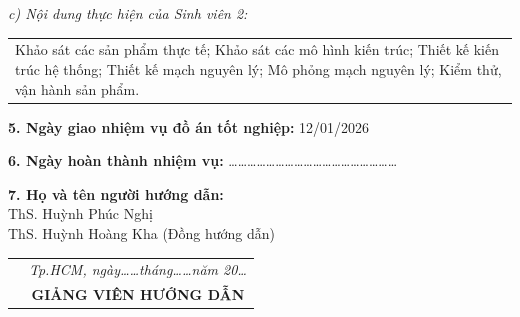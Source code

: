 \hphantom{..}\textit{c) Nội dung thực hiện của Sinh viên 2:} \\
\begin{tabular}{p{\textwidth}}
Khảo sát các sản phẩm thực tế; Khảo sát các mô hình kiến trúc; Thiết kế kiến trúc hệ thống; Thiết kế mạch nguyên lý; Mô phỏng mạch nguyên lý; Kiểm thử, vận hành sản phẩm.
\end{tabular}

\hphantom{..}\textbf{5. Ngày giao nhiệm vụ đồ án tốt nghiệp:} 12/01/2026

\hphantom{..}\textbf{6. Ngày hoàn thành nhiệm vụ:} \dots\dots\dots\dots\dots\dots\dots\dots\dots\dots\dots\dots\dots\dots\dots\dots\dots\dots

\hphantom{..}\textbf{7. Họ và tên người hướng dẫn:}\\
\hphantom{..}ThS. Huỳnh Phúc Nghị\\
\hphantom{..}ThS. Huỳnh Hoàng Kha (Đồng hướng dẫn)

\vspace{5pt}
\begin{tabular}{p{} p{}}
    & \multicolumn{1}{c}{\textit{Tp.HCM, ngày\dots\dots tháng\dots\dots năm 20\dots}} \\
    & \multicolumn{1}{c}{\textbf{GIẢNG VIÊN HƯỚNG DẪN}} \\
\end{tabular}